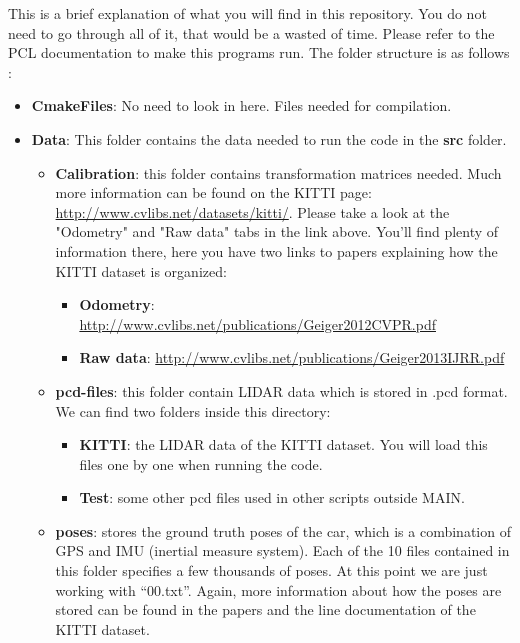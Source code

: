 \documentclass[twoside]{article}
\begin{document}
This is a brief explanation of what you will find in this repository. You do not need to go through all of it, that would be a wasted of time. Please refer to the PCL documentation to make this programs run. The folder structure is as follows :
\begin{itemize}

\item \textbf{CmakeFiles}: No need to look in here. Files needed for compilation.
\item \textbf{Data}: This folder contains the data needed to run the code in the \textbf{src} folder.

\begin{itemize}
	\item  \textbf{Calibration}: this folder contains transformation matrices needed. Much more information can be found on the KITTI page: \url{http://www.cvlibs.net/datasets/kitti/}. Please take a look at the "Odometry" and "Raw data" tabs in the link above. You'll find plenty of information there, here you have two links to papers explaining how the KITTI dataset is organized:
	\begin{itemize}
		\item \textbf{Odometry}: \url{http://www.cvlibs.net/publications/Geiger2012CVPR.pdf}
		\item \textbf{Raw data}: \url{http://www.cvlibs.net/publications/Geiger2013IJRR.pdf}
	\end{itemize}
	\item \textbf{pcd-files}: this folder contain LIDAR data which is stored in .pcd format. We can find two folders inside this directory:
	\begin{itemize}
		\item \textbf{KITTI}: the LIDAR data of the KITTI dataset. You will load this files one by one when running the code.
		\item \textbf{Test}: some other pcd files used in other scripts outside MAIN.
	\end{itemize}

	\item \textbf{poses}: stores the ground truth poses of the car, which is a combination of GPS and IMU (inertial measure system). Each of the 10 files contained in this folder specifies a few thousands of poses. At this point we are just working with “00.txt”. Again, more information about how the poses are stored can be found in the papers and the line documentation of the KITTI dataset.	
\end{itemize}


\end{itemize}
\end{document}
